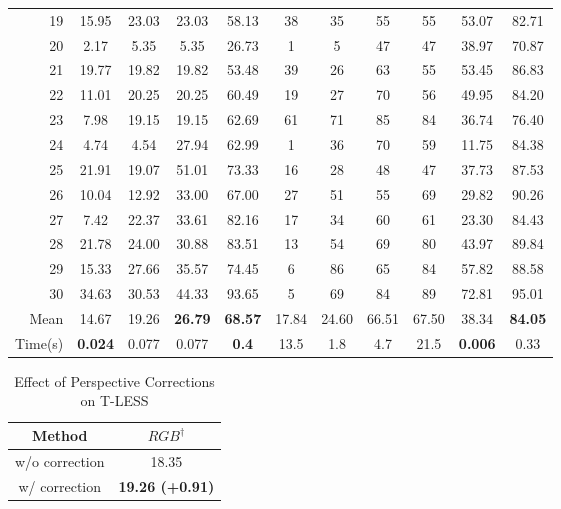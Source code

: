 {\begin{table*}[t]
\begin{adjustbox}{max width=\textwidth}
\begin{tabular}{r|ccc|ccccc|cc}
			19 &       15.95 & 		23.03 &  23.03 &   58.13  & 38&     35 &  55 &  55 & 53.07 &     82.71 \\
			20 &       2.17 &  		5.35 &   5.35 &    26.73  & 1&  5 &  47 &   47 & 38.97 &     70.87 \\
			21 &       19.77 & 		19.82 &  19.82 &   53.48  & 39&     26 &  63 &  55 & 53.45 &     86.83 \\
			22 &       11.01 & 	    20.25 &  20.25 &   60.49  & 19&     27 & 70 &  56 & 49.95 &     84.20 \\
			23 &       7.98 &  		19.15 &  19.15 &   62.69  & 61&     71 &  85 &  84 & 36.74 &     76.40 \\
			24 &       4.74 &  		4.54 &   27.94 &   62.99  & 1&  36 &  70 &   59 & 11.75 &     84.38 \\
			25 &      21.91 &  		19.07 &  51.01 &   73.33  & 16&     28 &  48 &   47 & 37.73 &     87.53 \\
			26 &       10.04 & 		12.92 &  33.00 &   67.00  & 27&     51 &  55 &  69 & 29.82 &     90.26 \\
			27 &       7.42 &  		22.37 &  33.61 &   82.16  & 17&     34 &  60 &   61 & 23.30 &     84.43 \\
			28 &      21.78 &  		24.00 &  30.88 &   83.51  & 13&     54 &  69 &   80 & 43.97 &     89.84 \\
			29 &      15.33 &  		27.66 &  35.57 &   74.45  & 6&  86 &  65 &   84 & 57.82 &     88.58 \\
			30 &      34.63 &  		30.53 &  44.33 &   93.65  & 5&  69 &  84 &   89 & 72.81 &     95.01 \\
			\midrule
			Mean &14.67 &19.26 & \textbf{26.79} &\textbf{68.57}& 17.84 &24.60& 66.51 &  67.50 &38.34 &\textbf{84.05}\\
			\midrule
			Time(s) & \textbf{0.024} &  0.077 &  0.077 &\textbf{0.4}& 13.5 & 1.8& 4.7 &  21.5 & \textbf{0.006} &0.33
		\end{tabular}
	\end{adjustbox}
	
	\label{tab:tless}
\end{table*}

	{\setlength{\tabcolsep}{0.4em}
	\begin{table}
		\centering
		\small
		\captionsetup{width=\textwidth}
		\caption{Effect of Perspective Corrections on T-LESS}
\begin{tabular}{c|c}
			\toprule
			Method & $RGB^\dag$  \\
			\midrule
			w/o correction & 18.35 \\
			w/ correction & \textbf{19.26 (+0.91)} 
		\end{tabular}
\label{tab:persp}
		

\end{table}}}
